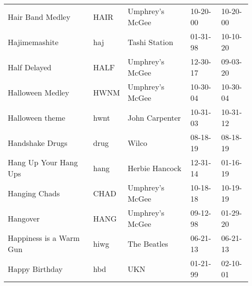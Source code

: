 \begin{longtable}{p{}p{}p{}p{}p{}}
                                                        Hair Band Medley &          HAIR &                                          Umphrey's McGee &              10-20-00 &             10-20-00 \\
                                                           Hajimemashite &           haj &                                            Tashi Station &              01-31-98 &             10-10-20 \\
                                                            Half Delayed &          HALF &                                          Umphrey's McGee &              12-30-17 &             09-03-20 \\
                                                        Halloween Medley &          HWNM &                                          Umphrey's McGee &              10-30-04 &             10-30-04 \\
                                                         Halloween theme &          hwnt &                                           John Carpenter &              10-31-03 &             10-31-12 \\
                                                         Handshake Drugs &          drug &                                                    Wilco &              08-18-19 &             08-18-19 \\
                                                   Hang Up Your Hang Ups &          hang &                                           Herbie Hancock &              12-31-14 &             01-16-19 \\
                                                           Hanging Chads &          CHAD &                                          Umphrey's McGee &              10-18-18 &             10-19-19 \\
                                                                Hangover &          HANG &                                          Umphrey's McGee &              09-12-98 &             01-29-20 \\
                                                 Happiness is a Warm Gun &          hiwg &                                              The Beatles &              06-21-13 &             06-21-13 \\
                                                          Happy Birthday &           hbd &                                                      UKN &              01-21-99 &             02-10-01 \\

\end{longtable}
